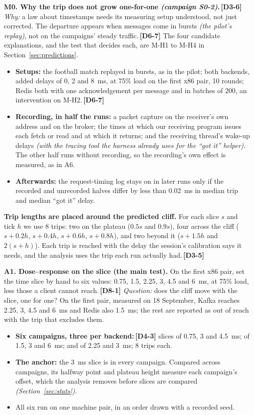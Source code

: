 \documentclass[11pt]{article}
\newcommand{\gl}[1]{{\color{soft}\itshape\small (#1)}}
\newcommand{\chg}[1]{\,{\color{chgcol}\bfseries\footnotesize[#1]}}
\newcommand{\chgold}[1]{\,{\color{oldcol}\bfseries\footnotesize[#1]}}
\begin{document}
\textbf{M0. Why the trip does not grow one-for-one \gl{campaign S0-2}.}\chgold{D3-6} \emph{Why:} a law about timestamps needs its measuring setup understood, not just corrected. The departure appears when messages come in bursts \gl{the pilot's replay}, not on the campaigns' steady traffic.\chgold{D6-7} The four candidate explanations, and the test that decides each, are M-H1 to M-H4 in Section~\ref{sec:predictions}.
\begin{itemize}
  \item \textbf{Setups:} the football match replayed in bursts, as in the pilot; both backends, added delays of 0, 2 and 8~ms, at 75\% load on the first x86 pair, 10 rounds; Redis both with one acknowledgement per message and in batches of 200, an intervention on M-H2.\chgold{D6-7}
  \item \textbf{Recording, in half the runs:} a packet capture on the receiver's own address and on the broker; the times at which our receiving program issues each fetch or read and at which it returns; and the receiving thread's wake-up delays \gl{with the tracing tool the harness already uses for the ``got it'' helper}. The other half runs without recording, so the recording's own effect is measured, as in A6.
  \item \textbf{Afterwards:} the request-timing log stays on in later runs only if the recorded and unrecorded halves differ by less than 0.02~ms in median trip and median ``got it'' delay.
\end{itemize}

\textbf{Trip lengths are placed around the predicted cliff.} For each slice $s$ and tick $h$ we use 8 trips: two on the plateau ($0.5s$ and $0.9s$), four across the cliff ($s + 0.2h$, $s + 0.4h$, $s + 0.6h$, $s + 0.8h$), and two beyond it ($s + 1.5h$ and $2(s + h)$). Each trip is reached with the delay the session's calibration says it needs, and the analysis uses the trip each run actually had.\chgold{D3-5}

\textbf{A1. Dose--response on the slice (the main test).} On the first x86 pair, set the time slice by hand to six values: 0.75, 1.5, 2.25, 3, 4.5 and 6~ms, at 75\% load, less those a client cannot reach.\chg{D8-1} \emph{Question:} does the cliff move with the slice, one for one? On the first pair, measured on 18 September, Kafka reaches 2.25, 3, 4.5 and 6~ms and Redis also 1.5~ms; the rest are reported as out of reach with the trip that excludes them.
\begin{itemize}
  \item \textbf{Six campaigns, three per backend:}\chgold{D4-3} slices of 0.75, 3 and 4.5~ms; of 1.5, 3 and 6~ms; and of 2.25 and 3~ms; 8 trips each.
  \item \textbf{The anchor:} the 3~ms slice is in every campaign. Compared across campaigns, its halfway point and plateau height measure each campaign's offset, which the analysis removes before slices are compared \gl{Section~\ref{sec:stats}}.
  \item All six run on one machine pair, in an order drawn with a recorded seed.
\end{itemize}
\end{document}
